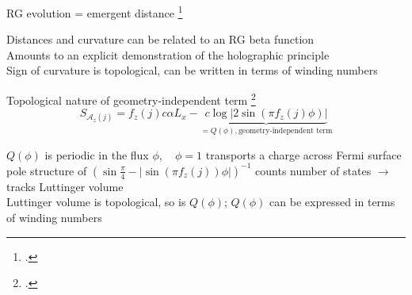 \documentclass[8pt,aspectratio=169]{beamer}
\begin{document}
\begin{frame}{RG evolution = emergent distance}
	\footcite{maldacena1999large,ryu2006aspects,holzhey_1994}
\begin{itemize}
	\nitem Distances and curvature can be related to an RG \alert{beta function}\\[10pt]
	\nitem Amounts to an \alert{explicit demonstration} of the holographic principle\\[10pt]
	\nitem Sign of curvature is \alert{topological}, can be written in terms of winding numbers\\[10pt]
\end{itemize}
	
\end{frame}

\begin{frame}{Topological nature of geometry-independent term}
	\footcite{luttinger1960ground,luttinger1960fermi,oshikawa2000topological,seki2017topological,anirbanurg1,Heath_2020}
	\[S_{\mathcal{A}_z(j)} = f_z(j) c \alpha L_x - \underbrace{c \log \big|2\sin\left(\pi f_z(j)\phi\right)\big|}_{=Q(\phi),\text{geometry-independent term}}\]
	\begin{itemize}
	\nitem \(Q(\phi)\) is periodic in the flux \(\phi\), ~ \(\phi=1\) transports a charge across Fermi surface\\[10pt]
	\nitem pole structure of \(\left(\sin \frac{\pi}{4} - |\sin\left(\pi f_z(j)\right)\phi|\right)^{-1}\) counts number of states \(\longrightarrow\) tracks Luttinger volume\\[10pt]
	\nitem Luttinger volume is topological, so is \(Q(\phi)\); \(Q(\phi)\) can be expressed in terms of winding numbers
	\end{itemize}
	
\end{frame}
\end{document}
